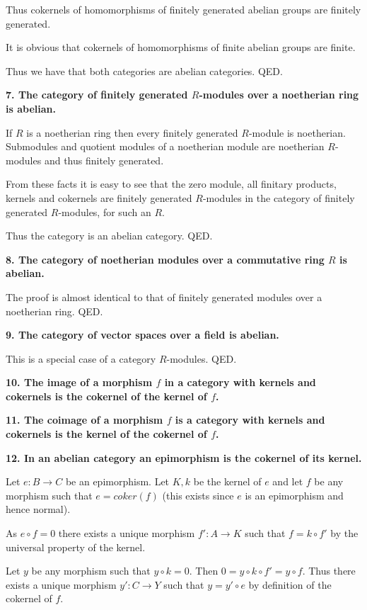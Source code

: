 \documentclass[12pt]{article}
\begin{document}
Thus cokernels of homomorphisms of finitely generated abelian groups are finitely generated.

It is obvious that cokernels of homomorphisms of finite abelian groups are finite.

Thus we have that both categories are abelian categories. QED.

\textbf{7. The category of finitely generated $R$-modules over a noetherian ring is abelian.}

If $R$ is a noetherian ring then every finitely generated $R$-module is noetherian. Submodules and quotient modules of a noetherian module are noetherian $R$-modules and thus finitely generated.

From these facts it is easy to see that the zero module, all finitary products, kernels and cokernels are finitely generated $R$-modules in the category of finitely generated $R$-modules, for such an $R$.

Thus the category is an abelian category. QED.

\textbf{8. The category of noetherian modules over a commutative ring $R$ is abelian.}

The proof is almost identical to that of finitely generated modules over a noetherian ring. QED.

\textbf{9. The category of vector spaces over a field is abelian.}

This is a special case of a category $R$-modules. QED.

\textbf{10. The image of a morphism $f$ in a category with kernels and cokernels is the cokernel of the kernel of $f$.}

\textbf{11. The coimage of a morphism $f$ is a category with kernels and cokernels is the kernel of the cokernel of $f$.}

\textbf{12. In an abelian category an epimorphism is the cokernel of its kernel.}

Let $e : B \to C$ be an epimorphism. Let $K, k$ be the kernel of $e$ and let $f$ be any morphism such that $e = coker(f)$ (this exists since $e$ is an epimorphism and hence normal).

As $e\circ f = 0$ there exists a unique morphism $f' : A \to K$ such that $f = k\circ f'$ by the universal property of the kernel.

Let $y$ be any morphism such that $y\circ k = 0$. Then $0 = y\circ k\circ f' = y\circ f$. Thus there exists a unique morphism $y' : C \to Y$ such that $y = y'\circ e$ by definition of the cokernel of $f$. 
\end{document}
